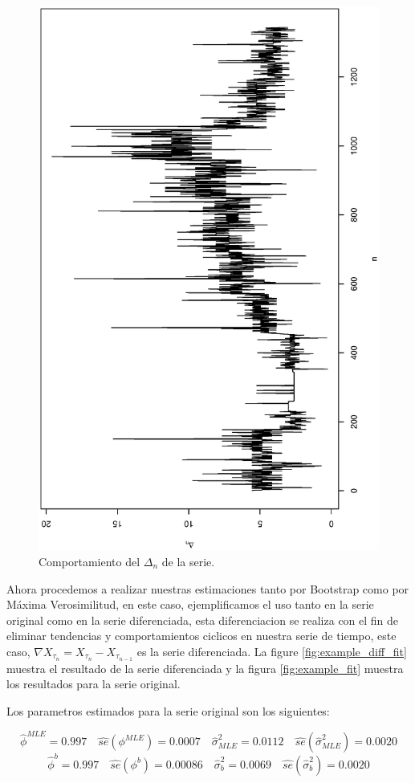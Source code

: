 \begin{figure}[h]
\begin{minipage}{0.45\textwidth}
    \includegraphics[width=0.8\linewidth,angle = 270]{Kap3/Fig_Cap3/example_delta.eps}
    \caption{Comportamiento del $\Delta_n$ de la serie.}
    \label{fig:example_delta}
    \end{minipage}
\end{figure}

Ahora procedemos a realizar nuestras estimaciones tanto por Bootstrap como por Máxima Verosimilitud, en este caso, ejemplificamos el uso tanto en la serie original
como en la serie diferenciada, esta diferenciacion se realiza con el fin de eliminar tendencias y comportamientos ciclicos en nuestra serie
de tiempo, este caso, $\nabla X_{\tau_n} = X_{\tau_n}-X_{\tau_{n-1}}$ es la serie diferenciada. La figure \ref{fig:example_diff_fit}
muestra el resultado de la serie diferenciada y la figura \ref{fig:example_fit} muestra los resultados para la serie original.

Los parametros estimados para la serie original son los siguientes:

$$\hat{\phi}^{MLE}= 0.997 \quad \hat{se}(\phi^{MLE})=0.0007 \quad \hat{\sigma}^{2}_{MLE}=0.0112 \quad \hat{se}(\hat{\sigma}^{2}_{MLE})=0.0020$$
$$\hat{\phi}^{b}= 0.997 \quad \hat{se}(\phi^{b})=0.00086 \quad \hat{\sigma}^{2}_{b}=0.0069  \quad \hat{se}(\hat{\sigma}^{2}_{b})=0.0020$$

